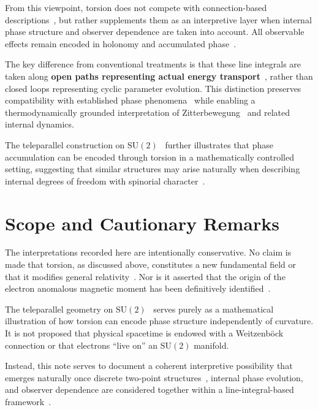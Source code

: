 \documentclass[12pt,letterpaper]{article}
\begin{document}
From this viewpoint, torsion does not compete with connection-based descriptions~\cite{hanamura18135855}, but rather supplements them as an interpretive layer when internal phase structure and observer dependence are taken into account. All observable effects remain encoded in holonomy and accumulated phase~\cite{hanamura18067760,hanamura18135855,hanamura18203433}.

The key difference from conventional treatments is that these line integrals are taken along \textbf{open paths representing actual energy transport}~\cite{hanamura18203433}, rather than closed loops representing cyclic parameter evolution. This distinction preserves compatibility with established phase phenomena~\cite{ABEffect,Berry1984,WilsonLoop} while enabling a thermodynamically grounded interpretation of Zitterbewegung~\cite{Schrodinger1930} and related internal dynamics.

The teleparallel construction on $\mathrm{SU}(2)$~\cite{Aldrovandi2013} further illustrates that phase accumulation can be encoded through torsion in a mathematically controlled setting, suggesting that similar structures may arise naturally when describing internal degrees of freedom with spinorial character~\cite{hanamura18067760}.


\section{Scope and Cautionary Remarks}

\justifying
The interpretations recorded here are intentionally conservative. No claim is made that torsion, as discussed above, constitutes a new fundamental field or that it modifies general relativity~\cite{Aldrovandi2013}. Nor is it asserted that the origin of the electron anomalous magnetic moment has been definitively identified~\cite{hanamura17765409}.

The teleparallel geometry on $\mathrm{SU}(2)$~\cite{Weitzenbock1923,Aldrovandi2013} serves purely as a mathematical illustration of how torsion can encode phase structure independently of curvature. It is not proposed that physical spacetime is endowed with a Weitzenb\"{o}ck connection or that electrons ``live on'' an $\mathrm{SU}(2)$ manifold.

Instead, this note serves to document a coherent interpretive possibility that emerges naturally once discrete two-point structures~\cite{hanamura16759284}, internal phase evolution, and observer dependence are considered together within a line-integral-based framework~\cite{hanamura18067760,hanamura18135855,hanamura18203433}.
\end{document}
